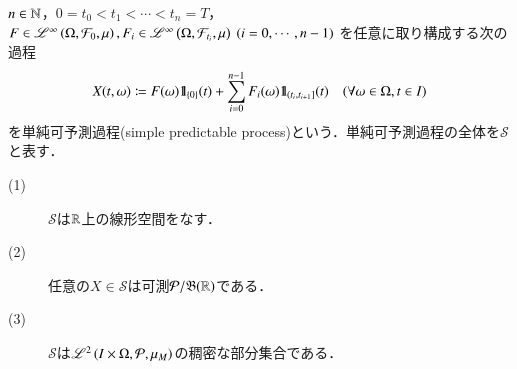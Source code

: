 	\begin{screen}
		\begin{dfn}[単純可予測過程]
			$n \in \mathbb{N}$，$0=t_0 < t_1 < \cdots < t_n = T$，
			$F \in \mathscr{L}^{\infty} \left(\Omega,\mathcal{F}_0,\mu\right),F_i \in \mathscr{L}^{\infty} \left(\Omega,\mathcal{F}_{t_i},\mu\right)\ (i=0,\cdots,n-1)$
			を任意に取り構成する次の過程
			\begin{align}
				X(t,\omega) \coloneqq F(\omega) \mbox{1}\hspace{-0.25em}\mbox{l}_{\{0\}} (t) + \sum_{i=0}^{n-1} F_i(\omega) \mbox{1}\hspace{-0.25em}\mbox{l}_{\left(t_i,t_{i+1}\right]}(t)
				\quad (\forall \omega \in \Omega,t \in I)
				\label{eq:dfn_simple_predictable_process}
			\end{align}
			を単純可予測過程(simple predictable process)という．単純可予測過程の全体を$\mathcal{S}$と表す．
			\label{dfn:predictable_simple_process}
		\end{dfn}
	\end{screen}
	
	\begin{screen}
		\begin{lem}[単純可予測過程の性質]\mbox{}
			\begin{description}
				\item[(1)] $\mathcal{S}$は$\mathbb{R}$上の線形空間をなす．
				\item[(2)] 任意の$X \in \mathcal{S}$は可測$\mathcal{P}/\mathfrak{B}(\mathbb{R})$である．
				\item[(3)] $\mathcal{S}$は$\mathscr{L}^{2} \left(I \times \Omega,\mathcal{P},\mu_M\right)$の稠密な部分集合である．
			\end{description}
			\label{lem:properties_of_simple_predictable_processes}
		\end{lem}
	\end{screen}
	
